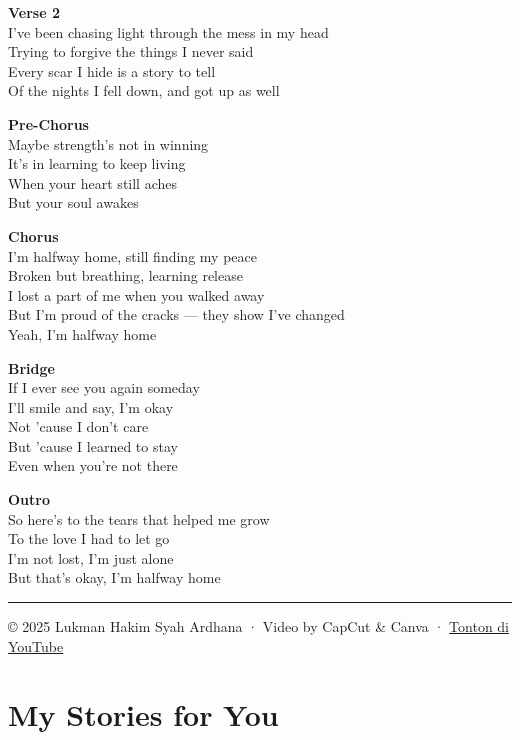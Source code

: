 \documentclass[
  letterpaper,
  DIV=11,
  numbers=noendperiod]{scrreprt}
\begin{document}
\textbf{Verse 2}\\
I've been chasing light through the mess in my head\\
Trying to forgive the things I never said\\
Every scar I hide is a story to tell\\
Of the nights I fell down, and got up as well

\textbf{Pre-Chorus}\\
Maybe strength's not in winning\\
It's in learning to keep living\\
When your heart still aches\\
But your soul awakes

\textbf{Chorus}\\
I'm halfway home, still finding my peace\\
Broken but breathing, learning release\\
I lost a part of me when you walked away\\
But I'm proud of the cracks --- they show I've changed\\
Yeah, I'm halfway home

\textbf{Bridge}\\
If I ever see you again someday\\
I'll smile and say, I'm okay\\
Not 'cause I don't care\\
But 'cause I learned to stay\\
Even when you're not there

\textbf{Outro}\\
So here's to the tears that helped me grow\\
To the love I had to let go\\
I'm not lost, I'm just alone\\
But that's okay, I'm halfway home

\begin{center}\rule{0.5\linewidth}{0.5pt}\end{center}

© 2025 Lukman Hakim Syah Ardhana · Video by CapCut \& Canva ·
\href{https://youtu.be/qKywgE79b1Q}{Tonton di YouTube}


\chapter{My Stories for You}\label{my-stories-for-you}
\end{document}
